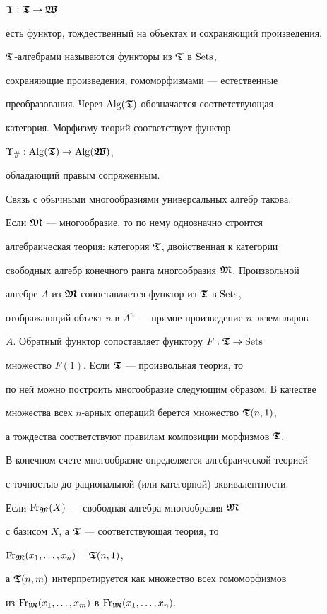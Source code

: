 $\Upsilon :{\boldsymbol{\frak T}} \to {\boldsymbol{\frak W}}$


есть функтор, тождественный на объектах и сохраняющий произведения.


${\boldsymbol{\frak T}}$-алгебрами называются функторы из ${\boldsymbol{\frak T}}$ в $\operatorname{Sets}$,


сохраняющие произведения, гомоморфизмами --- естественные


преобразования. Через $\operatorname{Alg}({\boldsymbol{\frak T}})$ обозначается соответствующая


категория. Морфизму теорий соответствует функтор


$\Upsilon_{\#} : \operatorname{Alg}({\boldsymbol{\frak T}}) \to \operatorname{Alg}({\boldsymbol{\frak W}})$,


обладающий правым сопряженным.





Связь с обычными многообразиями универсальных алгебр такова.


Если $\boldsymbol{\frak M}$ --- многообразие, то по нему однозначно строится


алгебраическая теория: категория $\boldsymbol{\frak T}$, двойственная к категории


свободных алгебр конечного ранга многообразия $\boldsymbol{\frak M}$. Произвольной


алгебре $A$ из $\boldsymbol{\frak M}$ сопоставляется функтор из $\boldsymbol{\frak T}$ в $\operatorname{Sets}$,


отображающий объект $n$ в $A^n$ --- прямое произведение $n$ экземпляров


$A$. Обратный функтор сопоставляет функтору $F: {\boldsymbol{\frak T}} \to \operatorname{Sets}$


множество $F(1)$. Если ${\boldsymbol{\frak T}}$ --- произвольная теория, то


по ней можно построить многообразие следующим образом. В качестве


множества всех $n$-арных операций берется множество ${\boldsymbol{\frak T}}(n,1)$,


а тождества соответствуют правилам композиции морфизмов ${\boldsymbol{\frak T}}$.


В конечном счете многообразие определяется алгебраической теорией


с точностью до рациональной (или категорной) эквивалентности.


Если $\operatorname{Fr}_{\boldsymbol{\frak M}}(X)$ --- свободная алгебра многообразия $\boldsymbol{\frak M}$


с базисом $X$, а ${\boldsymbol{\frak T}}$ --- соответствующая теория, то


$\operatorname{Fr}_{\boldsymbol{\frak M}}(x_1,\dotsc,x_n)={\boldsymbol{\frak T}}(n,1)$,


а ${\boldsymbol{\frak T}}(n,m)$ интерпретируется как множество всех гомоморфизмов


из $\operatorname{Fr}_{\boldsymbol{\frak M}}(x_1,\dotsc,x_m)$ в $\operatorname{Fr}_{\boldsymbol{\frak M}}(x_1,\dotsc,x_n)$.





